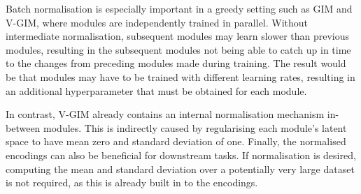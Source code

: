 		Batch normalisation is especially important in a greedy setting such as GIM and V-GIM, where modules are independently trained in parallel. Without intermediate normalisation, subsequent modules may learn slower than previous modules, resulting in the subsequent modules not being able to catch up in time to the changes from preceding modules made during training. The result would be that modules may have to be trained with different learning rates, resulting in an additional hyperparameter that must be obtained for each module.
		
		In contrast, V-GIM already contains an internal normalisation mechanism in-between modules. This is indirectly caused by regularising each module's latent space to have mean zero and standard deviation of one. Finally, the normalised encodings can also be beneficial for downstream tasks. If normalisation is desired, computing the mean and standard deviation over a potentially very large dataset is not required, as this is already built in to the encodings.

	
	

	






%
%
%		






